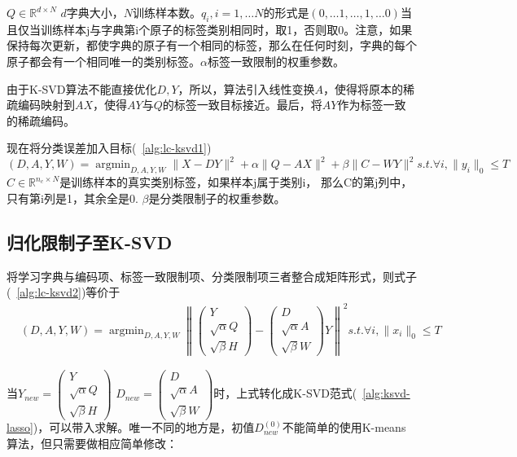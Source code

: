      $Q\in \mathbb{R}^{d \times N}$ $d$字典大小，$N$训练样本数。$q_i, i = 1, \dots N$的形式是$(0, \dots 1, \dots, 1, \dots 0)$当且仅当训练样本j与字典第i个原子的标签类别相同时，取1，否则取0。注意，如果保持每次更新，都使字典的原子有一个相同的标签，那么在任何时刻，字典的每个原子都会有一个相同唯一的类别标签。$\alpha $标签一致限制的权重参数。

    由于K-SVD算法不能直接优化$D, Y$，所以，算法引入线性变换$A$，使得将原本的稀疏编码映射到$AX$，使得$AY$与$Q$的标签一致目标接近。最后，将$AY$作为标签一致的稀疏编码。



    现在将分类误差加入目标(~\ref{alg:lc-ksvd1})\cite{jiang2013label}
    \begin{equation}
    \label{alg:lc-ksvd2}
    (D, A, Y, W) = \mathop{\arg \min} _{D, A, Y, W} \|X - DY\| ^ 2 + \alpha\|Q - AX\|^2 + \beta\|C - WY\|^2 s.t. \forall i, \|y_i\|_0 \le T
    \end{equation}
    $C\in \mathbb{R}^{n_c \times N}$是训练样本的真实类别标签，如果样本j属于类别i， 那么C的第j列中，只有第i列是1，其余全是0. $\beta$是分类限制子的权重参数。

    \subsection{归化限制子至K-SVD}

    将学习字典与编码项、标签一致限制项、分类限制项三者整合成矩阵形式\cite{jiang2013label}，则式子(~\ref{alg:lc-ksvd2})等价于
    \begin{equation}
    \begin{split}
    & (D, A, Y, W) = \mathop{\arg\min}_{D, A, Y, W} \left\|\begin{pmatrix} Y \\ \sqrt{\alpha} Q \\ \sqrt{\beta}H\end{pmatrix} - \begin{pmatrix} D \\ \sqrt{\alpha} A \\ \sqrt{\beta}W\end{pmatrix} Y\right\| ^2 s.t. \forall i, \|x_i\|_0 \le T
    \end{split}
    \end{equation}

    当$Y_{new} = \begin{pmatrix} Y \\ \sqrt{\alpha} Q \\ \sqrt{\beta}H\end{pmatrix}$ $D_{new} = \begin{pmatrix} D \\ \sqrt{\alpha} A \\ \sqrt{\beta}W\end{pmatrix}$时，上式转化成K-SVD范式(~\ref{alg:ksvd-lasso})，可以带入求解。唯一不同的地方是，初值$D_{new}^{(0)}$不能简单的使用K-means算法，但只需要做相应简单修改\cite{jiang2013label}：

